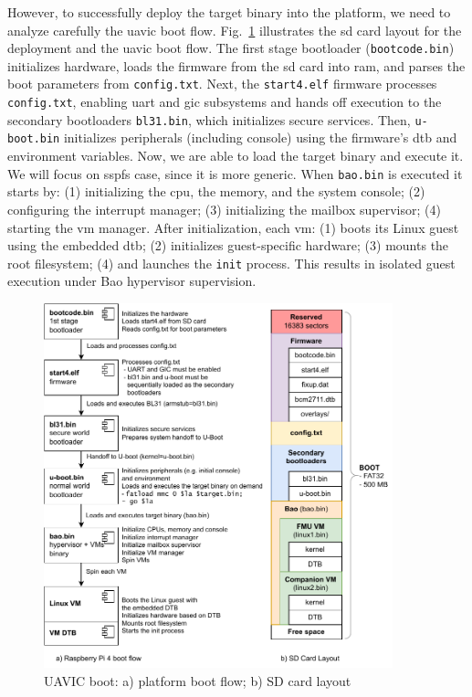 However, to successfully deploy the target binary into the platform, we need to
analyze carefully the \gls{uavic} boot flow. Fig.~\ref{fig:uav-main-rpi4-boot}
illustrates the \gls{sd} card layout for the deployment and the \gls{uavic} boot flow. The first stage bootloader
(\lstinline{bootcode.bin}) initializes hardware, loads the firmware from the
\gls{sd} card into \gls{ram}, and parses the boot parameters from
\lstinline{config.txt}.
%
Next, the \lstinline{start4.elf} firmware processes \lstinline{config.txt}, enabling \gls{uart} and \gls{gic} subsystems and hands off execution to the
secondary bootloaders \lstinline{bl31.bin}, which initializes secure services.
%
Then, \lstinline{u-boot.bin} initializes peripherals (including console) using
the firmware's \gls{dtb} and environment variables.
Now, we are able to load the target binary and execute it. We will focus on
\gls{sspfs} case, since it is more generic.
When \lstinline{bao.bin} is executed it starts by: (1) initializing the
\gls{cpu}, the memory, and the system console; (2) configuring the interrupt
manager; (3) initializing the mailbox supervisor; (4) starting the \gls{vm}
manager.
%
After initialization, each \gls{vm}: (1) boots its Linux guest using the
embedded \gls{dtb}; (2) initializes guest-specific hardware; (3) mounts the root
filesystem; (4) and launches the \lstinline{init} process. This results in
isolated guest execution under Bao hypervisor supervision.

\begin{figure}[!hbt]
  \centering
  \includegraphics[width=0.9\textwidth]{./img/pdf/uav-main-rpi4-boot} 
  \caption{UAVIC boot: a) platform boot flow; b) SD card layout}%
  \label{fig:uav-main-rpi4-boot}
\end{figure}

